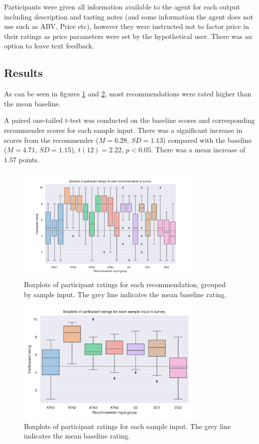 Participants were given all information available to the 
agent for each output including description and tasting notes (and some information the agent does not use such as 
ABV, Price etc), however they were instructed not to factor price in their ratings as price parameters were set 
by the hypothetical user. There was an option to leave text feedback.

\subsection{Results}\label{sec:res}

As can be seen in figures \ref{fig:allrec} and \ref{fig:avgrec}, most recommendations were rated higher than 
the mean baseline. 

A paired one-tailed t-test was conducted on the baseline scores and corresponding recommender scores for
each sample input. There was a significant increase in scores from the recommender ($M=6.28$, $SD=1.13$)
compared with the baseline ($M=4.71$, $SD=1.15$), $t(12) = 2.22$, $p<0.05$. There was a mean increase of $1.57$ 
points.

\begin{figure}[!htb]
    \centering
    \includegraphics[width=0.8\textwidth]{graphics/all_recommendations}
    \caption{Boxplots of participant ratings for each recommendation, grouped by sample input. The grey line 
    indicates the mean baseline rating.}\label{fig:allrec}
\end{figure}

\begin{figure}[!htb]
    \centering
    \includegraphics[width=0.8\textwidth]{graphics/avg_recommendations}
    \caption{Boxplots of participant ratings for each sample input. The grey line 
    indicates the mean baseline rating.}\label{fig:avgrec}
\end{figure}

